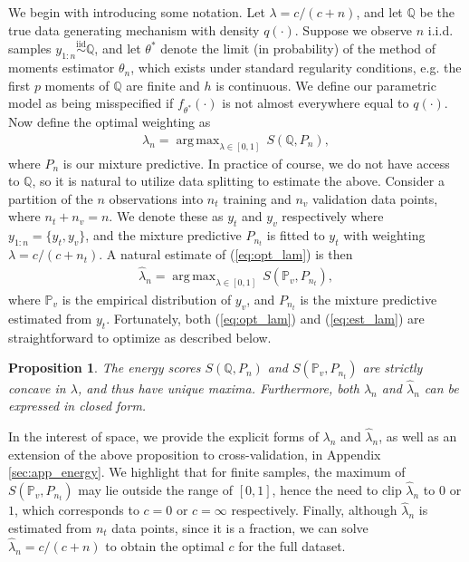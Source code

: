 \documentclass[11pt,a4paper]{article}
\newcommand{\iid}{\overset{\mathrm{iid}}{\sim}}
\DeclareMathOperator*{\argmax}{arg\,max}
\theoremstyle{plain}
\newtheorem{prop}{Proposition}
\theoremstyle{remark}
\theoremstyle{remark}
\begin{document}
 We begin with introducing some notation. Let {$\lambda={c}/{(c+n)}$}, and let $\mathbb{Q}$ be the true data generating mechanism with density $q(\cdot)$.  Suppose we observe $n$ i.i.d. samples $y_{1:n} \iid \mathbb{Q}$, and let $\theta^*$ denote the limit (in probability) of the method of moments estimator $\theta_n$, which exists under standard regularity conditions, e.g. the first $p$ moments of $\mathbb{Q}$ are finite and $h$ is continuous.
We define our parametric model as being misspecified if $f_{\theta^*}(\cdot)$ is not almost everywhere equal to $q(\cdot)$. Now define the optimal weighting as
\begin{align}\label{eq:opt_lam}
{\lambda_n = \argmax_{\lambda \in [0,1]} \, S\left(\mathbb{Q}, P_n\right),} 
\end{align}
where $P_n$ is our mixture predictive. In practice of course, we do not have access to $\mathbb{Q}$, so it is natural to utilize data splitting to estimate the above. Consider a partition of the $n$ observations into $n_t$ training and $n_v$ validation data points, where $n_t + n_v = n$. We denote these as $y_t$ and $y_v$ respectively where $y_{1:n} = \{y_t, y_v\}$, and {the mixture predictive $P_{n_t}$ is fitted to $y_t$ with weighting $\lambda = c/(c+n_t)$}. A natural estimate of (\ref{eq:opt_lam}) is then
\begin{align}\label{eq:est_lam}
{\widehat{\lambda}_n = \argmax_{\lambda \in [0,1]}\, S\left(\mathbb{P}_v, P_{n_t}\right),}
\end{align}
where $\mathbb{P}_v$ is the empirical distribution of $y_v$, and $P_{n_t}$ is the mixture predictive estimated from $y_t$.  Fortunately, both (\ref{eq:opt_lam}) and (\ref{eq:est_lam}) are straightforward to optimize as described below.

\begin{prop}\label{prop:concave}
    The energy scores $S\left(\mathbb{Q}, P_n\right)$ and $S\left(\mathbb{P}_v, P_{n_t}\right)$ are strictly concave in $\lambda$, and thus have unique maxima. Furthermore, both $\lambda_n$ and $\widehat{\lambda}_n$ can be expressed in closed form.
\end{prop}

In the interest of space, we provide the explicit forms of $\lambda_n$ and $\widehat{\lambda}_n$, as well as an extension of the above proposition to cross-validation, in Appendix \ref{sec:app_energy}. We highlight that for finite samples, {the maximum of $S\left(\mathbb{P}_v, P_{n_t}\right)$ may lie outside the range of $[0,1]$, hence the need to clip $\widehat{\lambda}_n$ to $0$ or $1$, which corresponds to $c = 0$ or $c = \infty$ respectively.} 
 Finally, although $\widehat{\lambda}_n$ is estimated from $n_t$ data points, since it is a fraction, we can solve $\widehat{\lambda}_n = c/(c+n)$ to obtain the optimal  $c$ for the full dataset.
\end{document}
